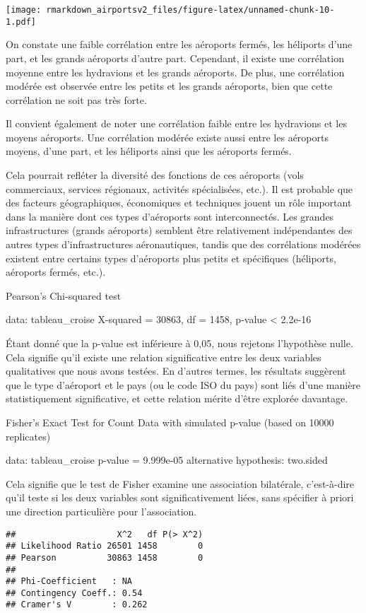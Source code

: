 \documentclass[
]{compterendu}
\begin{document}
\texttt{[image: rmarkdown\_airportsv2\_files/figure-latex/unnamed-chunk-10-1.pdf]}

On constate une faible corrélation entre les aéroports fermés, les
héliports d'une part, et les grands aéroports d'autre part. Cependant,
il existe une corrélation moyenne entre les hydravions et les grands
aéroports. De plus, une corrélation modérée est observée entre les
petits et les grands aéroports, bien que cette corrélation ne soit pas
très forte.

Il convient également de noter une corrélation faible entre les
hydravions et les moyens aéroports. Une corrélation modérée existe aussi
entre les aéroports moyens, d'une part, et les héliports ainsi que les
aéroports fermés.

Cela pourrait refléter la diversité des fonctions de ces aéroports (vols
commerciaux, services régionaux, activités spécialisées, etc.). Il est
probable que des facteurs géographiques, économiques et techniques
jouent un rôle important dans la manière dont ces types d'aéroports sont
interconnectés. Les grandes infrastructures (grands aéroports) semblent
être relativement indépendantes des autres types d'infrastructures
aéronautiques, tandis que des corrélations modérées existent entre
certains types d'aéroports plus petits et spécifiques (héliports,
aéroports fermés, etc.).

Pearson's Chi-squared test

data: tableau\_croise X-squared = 30863, df = 1458, p-value \textless{}
2.2e-16

Étant donné que la p-value est inférieure à 0,05, nous rejetons
l'hypothèse nulle. Cela signifie qu'il existe une relation significative
entre les deux variables qualitatives que nous avons testées. En
d'autres termes, les résultats suggèrent que le type d'aéroport et le
pays (ou le code ISO du pays) sont liés d'une manière statistiquement
significative, et cette relation mérite d'être explorée davantage.

Fisher's Exact Test for Count Data with simulated p-value (based on
10000 replicates)

data: tableau\_croise p-value = 9.999e-05 alternative hypothesis:
two.sided

Cela signifie que le test de Fisher examine une association bilatérale,
c'est-à-dire qu'il teste si les deux variables sont significativement
liées, sans spécifier à priori une direction particulière pour
l'association.

\begin{verbatim}
##                    X^2   df P(> X^2)
## Likelihood Ratio 26501 1458        0
## Pearson          30863 1458        0
## 
## Phi-Coefficient   : NA 
## Contingency Coeff.: 0.54 
## Cramer's V        : 0.262
\end{verbatim}
\end{document}
